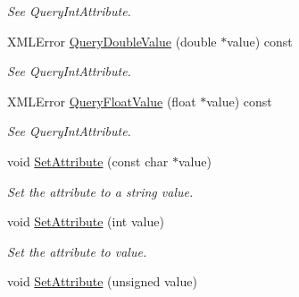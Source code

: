 \begin{DoxyCompactItemize}
\begin{DoxyCompactList}\small\item\em See Query\-Int\-Attribute. \end{DoxyCompactList}\item 
\hypertarget{classtinyxml2_1_1_x_m_l_attribute_a023f6e1ba0bc855314e95cc56f38ae0b}{X\-M\-L\-Error \hyperlink{classtinyxml2_1_1_x_m_l_attribute_a023f6e1ba0bc855314e95cc56f38ae0b}{Query\-Double\-Value} (double $\ast$value) const }\label{classtinyxml2_1_1_x_m_l_attribute_a023f6e1ba0bc855314e95cc56f38ae0b}

\begin{DoxyCompactList}\small\item\em See Query\-Int\-Attribute. \end{DoxyCompactList}\item 
\hypertarget{classtinyxml2_1_1_x_m_l_attribute_a28b61bc25564fc362d484f5ea8a48ba2}{X\-M\-L\-Error \hyperlink{classtinyxml2_1_1_x_m_l_attribute_a28b61bc25564fc362d484f5ea8a48ba2}{Query\-Float\-Value} (float $\ast$value) const }\label{classtinyxml2_1_1_x_m_l_attribute_a28b61bc25564fc362d484f5ea8a48ba2}

\begin{DoxyCompactList}\small\item\em See Query\-Int\-Attribute. \end{DoxyCompactList}\item 
\hypertarget{classtinyxml2_1_1_x_m_l_attribute_a959ceba445005da0919069d8857da01f}{void \hyperlink{classtinyxml2_1_1_x_m_l_attribute_a959ceba445005da0919069d8857da01f}{Set\-Attribute} (const char $\ast$value)}\label{classtinyxml2_1_1_x_m_l_attribute_a959ceba445005da0919069d8857da01f}

\begin{DoxyCompactList}\small\item\em Set the attribute to a string value. \end{DoxyCompactList}\item 
\hypertarget{classtinyxml2_1_1_x_m_l_attribute_a4908d5213836c1c05a3ee57b46f374c2}{void \hyperlink{classtinyxml2_1_1_x_m_l_attribute_a4908d5213836c1c05a3ee57b46f374c2}{Set\-Attribute} (int value)}\label{classtinyxml2_1_1_x_m_l_attribute_a4908d5213836c1c05a3ee57b46f374c2}

\begin{DoxyCompactList}\small\item\em Set the attribute to value. \end{DoxyCompactList}\item 
\hypertarget{classtinyxml2_1_1_x_m_l_attribute_af3870022c2b00c80851c22c6d10d37b5}{void \hyperlink{classtinyxml2_1_1_x_m_l_attribute_af3870022c2b00c80851c22c6d10d37b5}{Set\-Attribute} (unsigned value)}\label{classtinyxml2_1_1_x_m_l_attribute_af3870022c2b00c80851c22c6d10d37b5}


\end{DoxyCompactItemize}
